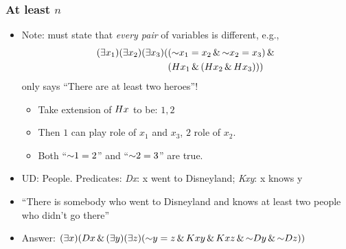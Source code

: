 \begin{frame}
  \frametitle{At least $n$}

\begin{itemize}[<+->]
\item Note: must state that \emph{every pair} of variables is different, e.g.,
\begin{align*}
\qt{\exists}{x_1}\qt{\exists}{x_2}\qt{\exists}{x_3}(&(\enot x_1 = x_2 \land \enot x_2 = x_3) \land {}\\
& (H\qv{x_1} \land (H\qv{x_2} \land H\qv{x_3})))
\end{align*}
only says ``There are at least two heroes''!
\begin{itemize}[<+->]
  \item Take extension of $Hx$ to be: $1,2$
  \item Then $1$ can play role of $x_1$ and $x_3$, $2$ role of $x_2$.
  \item Both ``$\enot 1=2$'' and ``$\enot 2=3$'' are true.
\end{itemize}

\item UD: People. Predicates: \emph{Dx}: x went to Disneyland; \emph{Kxy}: x knows y 

\item ``There is somebody who went to Disneyland and knows at least two people who didn't go there''

\item[] Answer: $\qt{\exists}{x} (Dx \eand \qt{\exists}{y} \qt{\exists}{z} (\enot y=z \eand Kxy \eand Kxz \eand \enot Dy \eand \enot Dz) )$

\end{itemize}
\end{frame}


